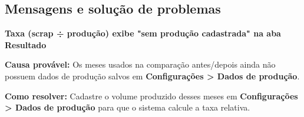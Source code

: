 \subsection*{Mensagens e solução de problemas}

\begin{remark}
\textbf{Taxa (scrap ÷ produção) exibe "sem produção cadastrada" na aba Resultado}\par
\textbf{Causa provável:} Os meses usados na comparação antes/depois ainda não possuem dados de produção salvos em \textbf{Configurações > Dados de produção}.\par
\textbf{Como resolver:} Cadastre o volume produzido desses meses em \textbf{Configurações > Dados de produção} para que o sistema calcule a taxa relativa.
\end{remark}

\fimdecapitulo
